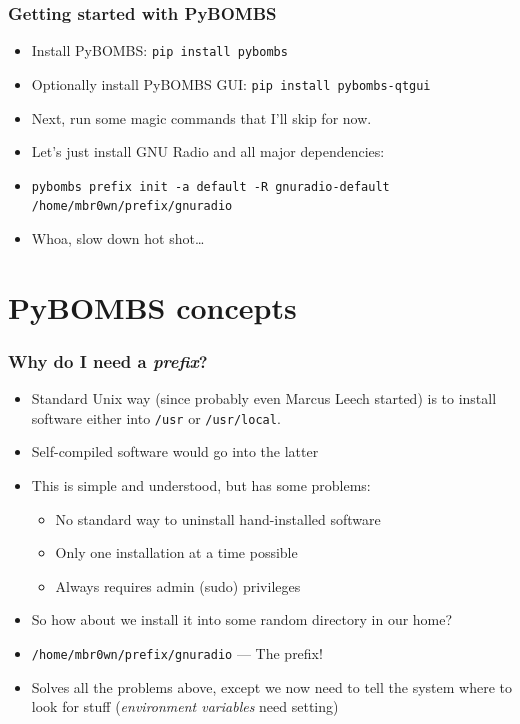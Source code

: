 \documentclass{beamer}
\begin{document}
\begin{frame}
  \frametitle{Getting started with PyBOMBS}
  \begin{itemize}
    \item Install PyBOMBS\@: \texttt{pip install pybombs}
    \item Optionally install PyBOMBS GUI\@: \texttt{pip install pybombs-qtgui}
    \item Next, run some magic commands that I'll skip for now.
    \item Let's just install GNU Radio and all major dependencies:
    \item \footnotesize{\texttt{pybombs prefix init -a default -R gnuradio-default /home/mbr0wn/prefix/gnuradio}}
    \item<2-> Whoa, slow down hot shot\ldots
  \end{itemize}
\end{frame}

\section{PyBOMBS concepts}
\begin{frame}
  \frametitle{Why do I need a \emph{prefix}?}
  \begin{itemize}
    \item Standard Unix way (since probably even Marcus Leech started) is to install software either into \texttt{/usr} or \texttt{/usr/local}.
    \item Self-compiled software would go into the latter
    \item This is simple and understood, but has some problems:
    \begin{itemize}
      \item No standard way to uninstall hand-installed software
      \item Only one installation at a time possible
      \item Always requires admin (sudo) privileges
    \end{itemize}
    \item So how about we install it into some random directory in our home?
    \item \texttt{/home/mbr0wn/prefix/gnuradio} --- The prefix!
    \item Solves all the problems above, except we now need to tell the system where to look for stuff (\emph{environment variables} need setting)
  \end{itemize}
\end{frame}
\end{document}
